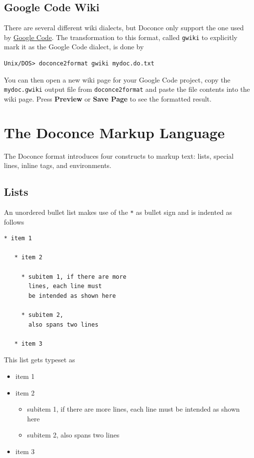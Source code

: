 \documentclass{article}
\begin{document}
\subsection{Google Code Wiki}

There are several different wiki dialects, but Doconce only support the
one used by \href{http://code.google.com/p/support/wiki/WikiSyntax}{Google Code}.
The transformation to this format, called {\fontsize{10pt}{10pt}\verb!gwiki!} to explicitly mark
it as the Google Code dialect, is done by
\begin{Verbatim}[fontsize=\fontsize{9pt}{9pt},tabsize=8,baselinestretch=0.85,
fontfamily=tt,xleftmargin=7mm]
Unix/DOS> doconce2format gwiki mydoc.do.txt
\end{Verbatim}
\noindent
You can then open a new wiki page for your Google Code project, copy
the {\fontsize{10pt}{10pt}\verb!mydoc.gwiki!} output file from {\fontsize{10pt}{10pt}\verb!doconce2format!} and paste the
file contents into the wiki page. Press \textbf{Preview} or \textbf{Save Page} to
see the formatted result.


\section{The Doconce Markup Language}

The Doconce format introduces four constructs to markup text:
lists, special lines, inline tags, and environments.

\subsection{Lists}

An unordered bullet list makes use of the {\fontsize{10pt}{10pt}\verb!*!} as bullet sign
and is indented as follows
\begin{Verbatim}[fontsize=\fontsize{9pt}{9pt},tabsize=8,baselinestretch=0.85,
fontfamily=tt,xleftmargin=7mm]
   * item 1

   * item 2

     * subitem 1, if there are more
       lines, each line must
       be intended as shown here

     * subitem 2,
       also spans two lines

   * item 3
\end{Verbatim}
\noindent

This list gets typeset as

\begin{itemize}
   \item item 1

   \item item 2
\begin{itemize}

     \item subitem 1, if there are more
       lines, each line must
       be intended as shown here

     \item subitem 2,
       also spans two lines

\end{itemize}

\noindent
   \item item 3
\end{itemize}
\end{document}
